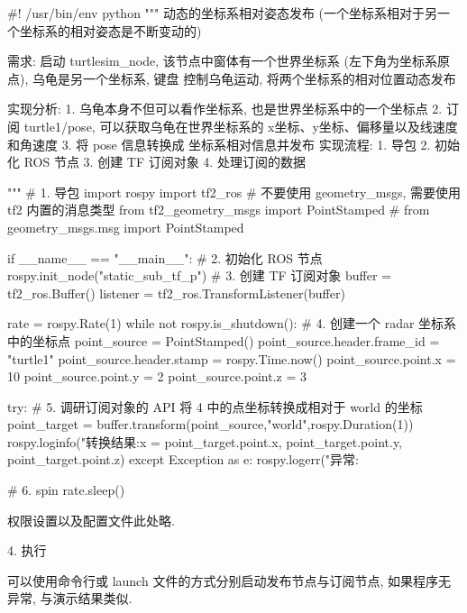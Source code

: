 \documentclass[openany, fontset=windowsold]{ctexbook}
\theoremstyle{kaiti}
\theoremstyle{normal}
\begin{document}
\begin{python}
  #! /usr/bin/env python
  """  
      动态的坐标系相对姿态发布 (一个坐标系相对于另一个坐标系的相对姿态是不断变动的)

      需求: 启动 turtlesim_node, 该节点中窗体有一个世界坐标系 (左下角为坐标系原点), 乌龟是另一个坐标系, 键盘
      控制乌龟运动, 将两个坐标系的相对位置动态发布

      实现分析:
          1. 乌龟本身不但可以看作坐标系, 也是世界坐标系中的一个坐标点
          2. 订阅 turtle1/pose, 可以获取乌龟在世界坐标系的 x坐标、y坐标、偏移量以及线速度和角速度
          3. 将 pose 信息转换成 坐标系相对信息并发布
      实现流程:
          1. 导包
          2. 初始化 ROS 节点
          3. 创建 TF 订阅对象
          4. 处理订阅的数据


  """
  # 1. 导包
  import rospy
  import tf2_ros
  # 不要使用 geometry_msgs, 需要使用 tf2 内置的消息类型
  from tf2_geometry_msgs import PointStamped
  # from geometry_msgs.msg import PointStamped

  if __name__ == "__main__":
      # 2. 初始化 ROS 节点
      rospy.init_node("static_sub_tf_p")
      # 3. 创建 TF 订阅对象
      buffer = tf2_ros.Buffer()
      listener = tf2_ros.TransformListener(buffer)

      rate = rospy.Rate(1)
      while not rospy.is_shutdown():    
      # 4. 创建一个 radar 坐标系中的坐标点
          point_source = PointStamped()
          point_source.header.frame_id = "turtle1"
          point_source.header.stamp = rospy.Time.now()
          point_source.point.x = 10
          point_source.point.y = 2
          point_source.point.z = 3

          try:
      #     5. 调研订阅对象的 API 将 4 中的点坐标转换成相对于 world 的坐标
              point_target = buffer.transform(point_source,"world",rospy.Duration(1))
              rospy.loginfo("转换结果:x = %
                              point_target.point.x,
                              point_target.point.y,
                              point_target.point.z)
          except Exception as e:
              rospy.logerr("异常:%

      #     6. spin
          rate.sleep()
\end{python}

权限设置以及配置文件此处略.

4. 执行

可以使用命令行或 launch 文件的方式分别启动发布节点与订阅节点, 如果程序无异常, 与演示结果类似.
\end{document}
